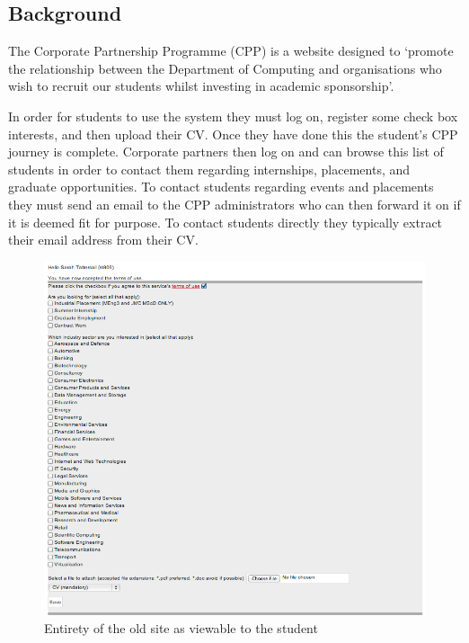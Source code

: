 \subsection{Background}
The Corporate Partnership Programme (CPP) is a website designed to `promote the relationship between the Department of Computing and organisations who wish to recruit our students whilst investing in academic sponsorship'\cite{doc-cpp}.

In order for students to use the system they must log on, register some check box interests, and then upload their CV.
Once they have done this the student's CPP journey is complete.
Corporate partners then log on and can browse this list of students in order to contact them regarding internships, placements, and graduate opportunities. To contact students regarding events and placements they must send an email to the CPP administrators who can then forward it on if it is deemed fit for purpose. To contact students directly they typically extract their email address from their CV.

\begin{figure}[H]\centering
\includegraphics[scale=0.5]{images/introduction/old_cpp}
\caption{Entirety of the old site as viewable to the student}
\end{figure}
